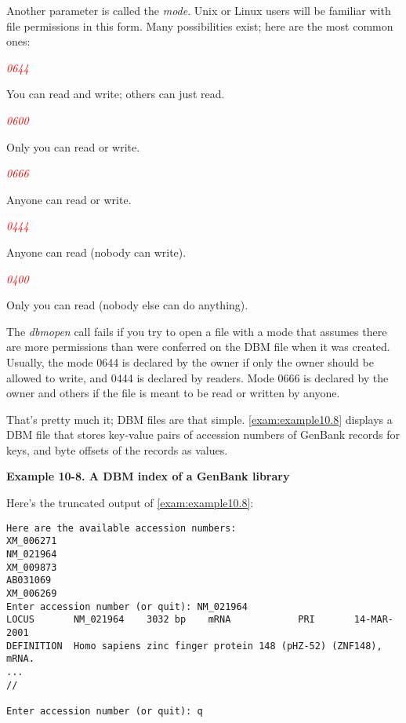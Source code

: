 Another parameter is called the \textit{mode}. Unix or Linux users will be familiar with file permissions in this form. Many possibilities exist; here are the most common ones:

\textcolor{red}{\textit{0644}}
\begin{adjustwidth}{1cm}{}
You can read and write; others can just read.
\end{adjustwidth}

\textcolor{red}{\textit{0600}}
\begin{adjustwidth}{1cm}{}
Only you can read or write.
\end{adjustwidth}

\textcolor{red}{\textit{0666}}
\begin{adjustwidth}{1cm}{}
Anyone can read or write.
\end{adjustwidth}

\textcolor{red}{\textit{0444}}
\begin{adjustwidth}{1cm}{}
Anyone can read (nobody can write).
\end{adjustwidth}

\textcolor{red}{\textit{0400}}
\begin{adjustwidth}{1cm}{}
Only you can read (nobody else can do anything).
\end{adjustwidth}

The \textit{dbmopen} call fails if you try to open a file with a mode that assumes there are more permissions than were conferred on the DBM file when it was created. Usually, the mode 0644 is declared by the owner if only the owner should be allowed to write, and 0444 is declared by readers. Mode 0666 is declared by the owner and others if the file is meant to be read or written by anyone.

That's pretty much it; DBM files are that simple. \autoref{exam:example10.8} displays a DBM file that stores key-value pairs of accession numbers of GenBank records for keys, and byte offsets of the records as values.

\textbf{Example 10-8. A DBM index of a GenBank library}


Here's the truncated output of \autoref{exam:example10.8}:

\begin{lstlisting}
Here are the available accession numbers:
XM_006271
NM_021964
XM_009873
AB031069
XM_006269
Enter accession number (or quit): NM_021964
LOCUS       NM_021964    3032 bp    mRNA            PRI       14-MAR-2001
DEFINITION  Homo sapiens zinc finger protein 148 (pHZ-52) (ZNF148), mRNA.
...
//

Enter accession number (or quit): q
\end{lstlisting}

